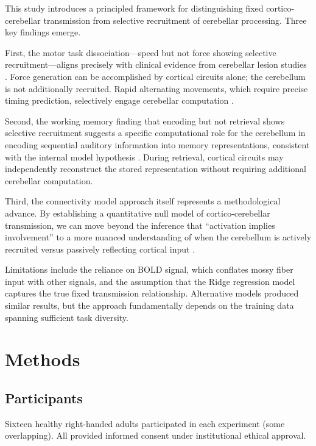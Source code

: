 \documentclass[11pt]{article}
\begin{document}
This study introduces a principled framework for distinguishing fixed cortico-cerebellar transmission from selective recruitment of cerebellar processing. Three key findings emerge.

First, the motor task dissociation---speed but not force showing selective recruitment---aligns precisely with clinical evidence from cerebellar lesion studies \citep{spencer2003disrupted, bastian2006learning}. Force generation can be accomplished by cortical circuits alone; the cerebellum is not additionally recruited. Rapid alternating movements, which require precise timing prediction, selectively engage cerebellar computation \citep{wolpert1998internal, miall1993there}.

Second, the working memory finding that encoding but not retrieval shows selective recruitment suggests a specific computational role for the cerebellum in encoding sequential auditory information into memory representations, consistent with the internal model hypothesis \citep{ito2008control, ramnani2006cerebellum}. During retrieval, cortical circuits may independently reconstruct the stored representation without requiring additional cerebellar computation.

Third, the connectivity model approach itself represents a methodological advance. By establishing a quantitative null model of cortico-cerebellar transmission, we can move beyond the inference that ``activation implies involvement'' to a more nuanced understanding of when the cerebellum is actively recruited versus passively reflecting cortical input \citep{diedrichsen2019universal, king2019functional}.

Limitations include the reliance on BOLD signal, which conflates mossy fiber input with other signals, and the assumption that the Ridge regression model captures the true fixed transmission relationship. Alternative models produced similar results, but the approach fundamentally depends on the training data spanning sufficient task diversity.

\section{Methods}

\subsection{Participants}
Sixteen healthy right-handed adults participated in each experiment (some overlapping). All provided informed consent under institutional ethical approval.
\end{document}
